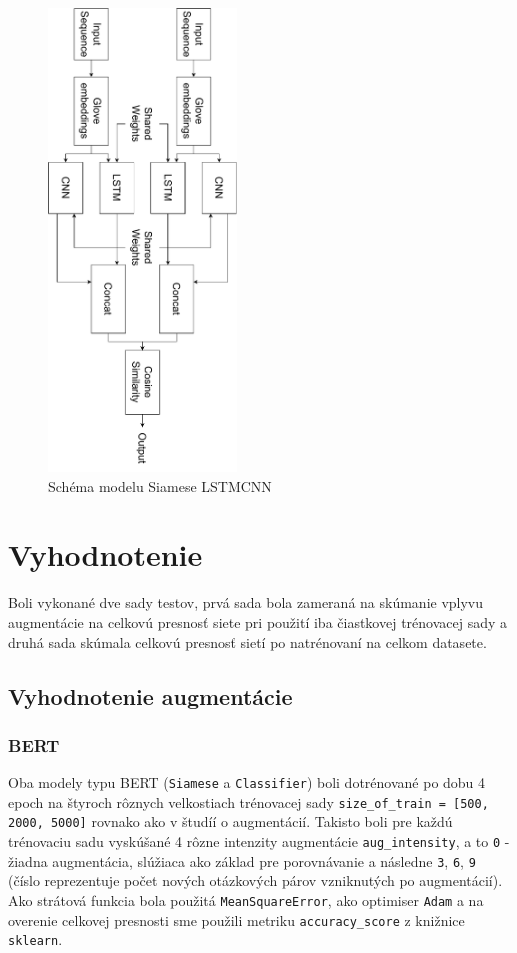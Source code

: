 \documentclass[a4paper, 16pt]{article}
\begin{document}
\begin{figure}[H]
    \centering
    \includegraphics[width=5cm, angle =90 ]{LSTM_CNN.pdf}
    \caption{Schéma modelu Siamese LSTMCNN}
    \label{fig:6}
\end{figure}


\section{Vyhodnotenie}
\label{vyhodnotenie}

Boli vykonané dve sady testov, prvá sada bola zameraná na skúmanie vplyvu augmentácie na celkovú presnosť siete pri použití iba čiastkovej trénovacej sady a druhá sada skúmala celkovú presnosť sietí po natrénovaní na celkom datasete. 

\subsection{Vyhodnotenie augmentácie}
\subsubsection{BERT}
Oba modely typu BERT (\texttt{Siamese} a \texttt{Classifier}) boli dotrénované po dobu 4 epoch na štyroch rôznych velkostiach trénovacej sady \texttt{size\_of\_train = [500, 2000, 5000]} rovnako ako v študíí o augmentácií. Takisto boli pre každú trénovaciu sadu vyskúšané 4 rôzne intenzity augmentácie \texttt{aug\_intensity}, a to \texttt{0} - žiadna augmentácia, slúžiaca ako základ pre porovnávanie a následne \texttt{3}, \texttt{6}, \texttt{9} (číslo reprezentuje počet nových otázkových párov vzniknutých po augmentácií). Ako strátová funkcia bola použitá \texttt{MeanSquareError}, ako optimiser \texttt{Adam} a na overenie celkovej presnosti sme použili metriku \texttt{accuracy\_score} z knižnice \texttt{sklearn}.
\end{document}
